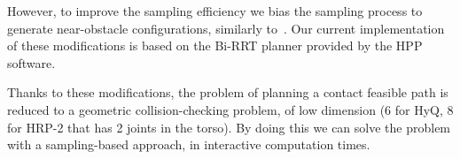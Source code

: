 However, to improve the sampling efficiency 
we bias the sampling process to generate near-obstacle configurations, similarly to~\cite{Amato98choosinggood}.
Our current implementation of these modifications is based on the Bi-RRT planner \citep{770022} provided by the HPP software.

Thanks to these modifications, the problem of planning a \gls{contact feasible} path is reduced to a geometric collision-checking problem, of low dimension (6 for HyQ, 8 for HRP-2 that has 2 joints in the torso). By doing this we can solve the problem with a sampling-based approach, in \gls{interactive} computation times.
